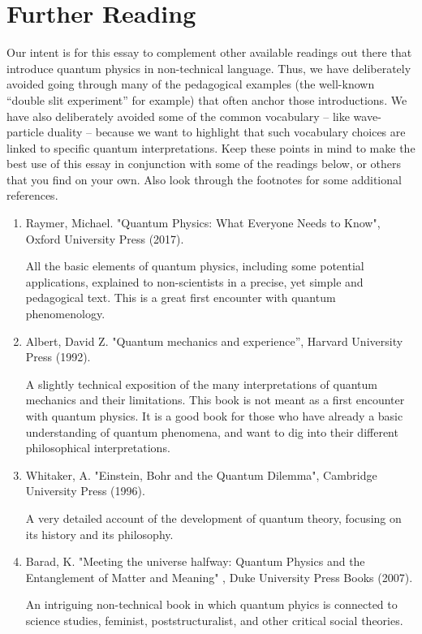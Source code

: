 \documentclass[12pt,onecolumn,preprintnumbers,amsmath,amssymbn,reprint,nofootinbib,superscriptaddress]{revtex4}    %
\begin{document}
\section{Further Reading}

Our intent is for this essay to complement other available readings out there that introduce quantum physics in non-technical language.  Thus, we have deliberately avoided going through many of the pedagogical examples (the well-known ``double slit experiment'' for example) that often anchor those introductions.  We have also deliberately avoided some of the common vocabulary -- like wave-particle duality -- because we want to highlight that such vocabulary choices are linked to specific quantum interpretations.  Keep these points in mind to make the best use of this essay in conjunction with some of the readings below, or others that you find on your own.  Also look through the footnotes for some additional references.

%

\begin{enumerate}\item Raymer, Michael. "Quantum Physics: What Everyone Needs to Know", Oxford University Press (2017).\par
All the basic elements of quantum physics, including some potential applications, explained to non-scientists in a precise, yet simple and pedagogical text. This is a great first encounter with quantum phenomenology.

\item Albert, David Z. "Quantum mechanics and experience'', Harvard University Press (1992).
\par A slightly technical exposition of the many interpretations of quantum mechanics and their limitations. This book is not meant as a first encounter with quantum physics. It is a  good book for those who have already a basic understanding of quantum phenomena, and want to dig into their different philosophical interpretations.
\item Whitaker, A. "Einstein, Bohr and the Quantum Dilemma", Cambridge University Press (1996).
\par A very detailed account of the development of quantum theory, focusing on its history and its philosophy.
\item Barad, K. "Meeting the universe halfway: Quantum Physics and the Entanglement of Matter and Meaning" , Duke University Press Books (2007).
\par An intriguing non-technical book in which quantum phyics is connected to science studies, feminist, poststructuralist, and other critical social theories.
\end{enumerate}
\end{document}
